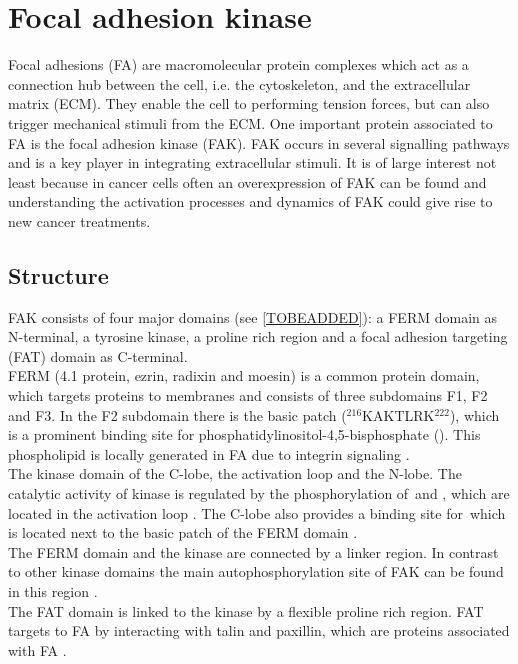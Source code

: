 \section{Focal adhesion kinase}
Focal adhesions (FA) are macromolecular protein complexes which act as a connection hub between the cell, i.e. the cytoskeleton, and the extracellular matrix (ECM). They enable the cell to performing tension forces, but can also trigger mechanical stimuli from the ECM. One important protein associated to FA is the focal adhesion kinase (FAK). FAK occurs in several signalling pathways and is a key player in integrating extracellular stimuli. It is of large interest not least because in cancer cells often an overexpression of FAK can be found and understanding the activation processes and dynamics of FAK could give rise to new cancer treatments.%
\subsection{Structure}
FAK consists of four major domains (see \autoref{TOBEADDED}): a FERM domain as N-terminal, a tyrosine kinase, a proline rich region and a focal adhesion targeting (FAT) domain as C-terminal.\\
FERM (4.1 protein, ezrin, radixin and moesin) is a common protein domain, which targets proteins to membranes \autocite{fermdomain} and consists of three subdomains F1, F2 and F3. In the F2 subdomain there is the basic patch  ($^{216}$KAKTLRK$^{222}$), which is a prominent binding site for phosphatidylinositol-4,5-bisphosphate (\pip). This phospholipid is locally generated in FA due to integrin signaling \autocite{pap001}.\\
The kinase domain of the C-lobe, the activation loop and the N-lobe. The catalytic activity of kinase is regulated by the phosphorylation of \,and , which are located in the activation loop \autocite{tyrosinePhosphor}. The C-lobe also provides a binding site for \pip\,which is located next to the basic patch of the FERM domain \autocite{pap002}.\\
The FERM domain and the kinase are connected by a linker region. In contrast to other kinase domains the main autophosphorylation site of FAK  can be found in this region \autocite{pap001}.\\ %
The FAT domain is linked to the kinase by a flexible proline rich region. FAT targets to FA by interacting with talin and paxillin, which are proteins associated with FA \autocite{fatdomain}.
